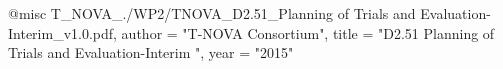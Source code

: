 @misc{ T_NOVA_./WP2/TNOVA_D2.51_Planning of Trials and Evaluation-Interim_v1.0.pdf,
       author = "T-NOVA Consortium",
       title = "D2.51 Planning of Trials and Evaluation-Interim ",
       year = "2015" }
